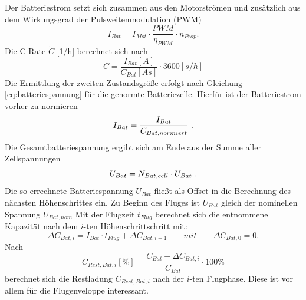 Der Batteriestrom setzt sich zusammen aus den Motorströmen und zusätzlich aus dem Wirkungsgrad der Pulsweitenmodulation (PWM)
\begin{equation}
	I_{Bat} = I_{Mot}\cdot \frac{PWM}{\eta_{PWM}}\cdot n_{Prop}.  \label{eq:batteriestrom}
\end{equation}
Die C-Rate \ensuremath{\dot{C}} [1/h] berechnet sich nach 
\begin{equation}
	\dot{C} = \frac{I_{Bat}[A]}{C_{Bat}[As]}\cdot 3600[s/h]
\end{equation}
Die Ermittlung der zweiten Zustandsgröße erfolgt nach Gleichung \ref{eq:batteriespannung} für die genormte Batteriezelle. Hierfür ist der Batteriestrom vorher zu normieren
\begin{equation}
	I_{Bat} = \frac{I_{Bat}}{C_{Bat,normiert}} ~\text{.}
\end{equation}
Die Gesamtbatteriespannung ergibt sich am Ende aus der Summe aller Zellspannungen
\begin{equation}
	U_{Bat} = N_{Bat,cell}\cdot U_{Bat} ~\text{.}
\end{equation}
Die so errechnete Batteriespannung \ensuremath{U_{Bat}} fließt als Offset in die Berechnung des nächsten Höhenschrittes ein. Zu Beginn des Fluges ist \ensuremath{U_{Bat}} gleich der nominellen Spannung \ensuremath{U_{Bat,nom}}
Mit der Flugzeit \ensuremath{t_{Flug}} berechnet sich die entnommene Kapazität nach dem \ensuremath{i}-ten Höhenschrittschritt mit: 
\begin{equation}
	\Delta C_{Bat,i} = I_{Bat}\cdot t_{Flug} + \Delta C_{Bat,i-1} 
	\qquad mit \qquad \Delta C_{Bat,0} = 0.
\end{equation}
Nach
\begin{equation}
	C_{Rest,Bat,i}[\%] = \frac{C_{Bat}-\Delta C_{Bat,i}}{C_{Bat}}\cdot 100\%
\end{equation}
berechnet sich die Restladung \ensuremath{C_{Rest,Bat,i}} nach der \ensuremath{i}-ten Flugphase. Diese ist vor allem für die Flugenveloppe interessant.\\



